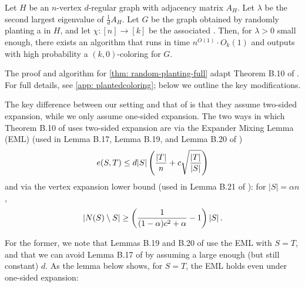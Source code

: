\begin{theorem}
    \label{thm: random-planting-full}
    Let $H$ be an $n$-vertex $d$-regular graph with adjacency matrix $A_H$.
    Let $\lambda$ be the second largest eigenvalue of $\frac{1}{d}A_H$.
    Let $G$ be the graph obtained by randomly planting a \kcl in $H$, and let $\chi: [n] \to [k]$ be the associated \kcl.
    Then, for $\lambda > 0$ small enough, there exists an algorithm that runs in time $n^{O(1)} \cdot O_{k}(1)$ and outputs with high probability a $(k, 0)$-coloring for $G$.
\end{theorem}

The proof and algorithm for \cref{thm: random-planting-full} adapt Theorem B.10 of \cite{MR3536556-David16}. For full details, see \cref{app: plantedcoloring}; below we outline the key modifications.


The key difference between our setting and that of \cite{MR3536556-David16} is that they assume two-sided expansion, while we only assume one-sided expansion.
The two ways in which Theorem B.10 of \cite{MR3536556-David16} uses two-sided expansion are via the Expander Mixing Lemma (EML) (used in Lemma B.17, Lemma B.19, and Lemma B.20 of \cite{MR3536556-David16})
$$e(S, T)\leq d|S|\left(\frac{|T|}{n}+c\sqrt{\frac{|T|}{|S|}}\right)$$
and via the vertex expansion lower bound (used in Lemma B.21 of \cite{MR3536556-David16}): for $|S|=\alpha n$, 
$$\left\lvert N(S)\setminus S\right\rvert\geq \left(\frac{1}{(1-\alpha)c^2+\alpha}-1\right)|S|\,.$$

For the former, we note that Lemmas B.19 and B.20 of \cite{MR3536556-David16} use the EML with $S=T$, and that we can avoid Lemma B.17 of \cite{MR3536556-David16} by assuming a large enough (but still constant) $d$. As the lemma below shows, for $S=T$, the EML holds even under one-sided expansion:


